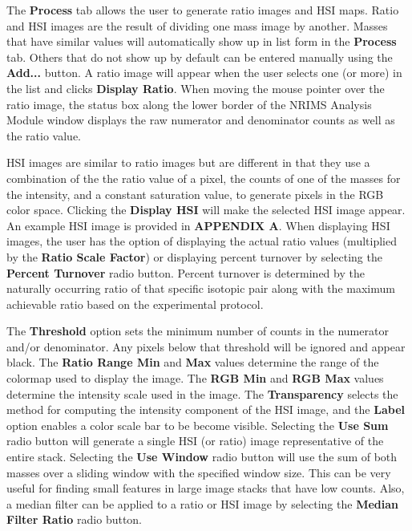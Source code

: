 \documentclass{article}
\begin{document}
	The \textbf{Process} tab allows the user to generate ratio images and HSI maps. 
	Ratio and HSI images are the result of dividing one mass image by another. Masses that have 
	similar values will automatically show up in list form in the \textbf{Process} tab.
	Others that do not show up by default can be 
	entered manually using the \textbf{Add...} button.
	A ratio image will appear when the user selects one (or more) in the list and 
	clicks \textbf{Display Ratio}. When moving the mouse pointer 
	over the ratio image, the 
	status box along the lower border of the NRIMS Analysis Module window displays 
	the raw numerator and denominator counts as well as the ratio value.

	HSI images are similar to ratio images but are different
	in that they use a combination of the the ratio value of a pixel, the counts of one of 
	the masses for the intensity, and a constant saturation value, to generate pixels in the RGB 
	color space. Clicking the \textbf{Display HSI} will make the selected HSI image appear. An example 
	HSI image is provided in \textbf{APPENDIX A}. When displaying HSI
	images, the user has the option of displaying the actual ratio values 
	(multiplied by the \textbf{Ratio Scale Factor}) or displaying percent turnover by selecting the 
	\textbf{Percent Turnover} radio button. Percent turnover is determined by the naturally occurring ratio
	of that specific isotopic pair along with the maximum achievable ratio based on the experimental protocol.

	The \textbf{Threshold} option sets the minimum number of counts in the numerator and/or 
	denominator. Any pixels below that threshold will be ignored and appear black.
	The \textbf{Ratio Range Min} and \textbf{Max} values determine the range of the colormap
	used to display the image. The \textbf{RGB Min} and \textbf{RGB Max} values determine
	the intensity scale used in the image. The \textbf{Transparency} selects the 
	method for computing the intensity component of the HSI image, and the \textbf{Label} 
	option enables a color scale bar to be become visible. Selecting the \textbf{Use Sum}
	radio button will generate a single HSI (or ratio) image representative of the entire stack. Selecting 
	the \textbf{Use Window} radio button will use the sum of both masses over a sliding window 
	with the specified window size. This can be very useful for finding small features in large image 
	stacks that have low counts. Also, a median filter 
	can be applied to a ratio or HSI image by selecting the \textbf{Median Filter Ratio} 
	radio button.
\end{document}
